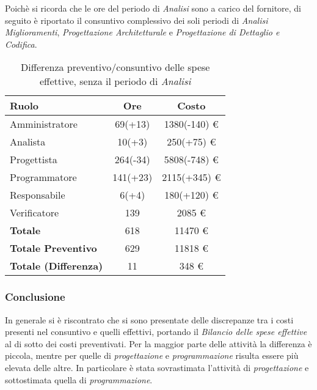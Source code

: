 Poich\`e si ricorda che le ore del periodo di \textit{Analisi} sono a carico del fornitore, di seguito \`e riportato il consuntivo complessivo dei soli periodi di \textit{Analisi Miglioramenti}, \textit{Progettazione Architetturale} e \textit{Progettazione di Dettaglio e Codifica}.

\begin{table}[H]
	\centering
	\begin{tabular}{ l c c }
		\textbf{Ruolo} & \textbf{Ore} & \textbf{Costo} \\
		\hline
		Amministratore & 69(+13) & 1380(-140) \euro{} \\
		Analista & 10(+3) & 250(+75) \euro{} \\
		Progettista & 264(-34) & 5808(-748) \euro{} \\
		Programmatore & 141(+23) & 2115(+345) \euro{} \\
		Responsabile & 6(+4) & 180(+120) \euro{} \\
		Verificatore & 139 & 2085 \euro{} \\
		\hline
		\textbf{Totale \glossaryItem{Consuntivo}} & 618 & 11470 \euro{} \\
		\hline
		\textbf{Totale Preventivo} & 629 & 11818 \euro{} \\
		\hline
		\textbf{Totale (Differenza)} & 11 & 348 \euro{} \\
		\hline
	\end{tabular}
	\caption{Differenza preventivo/consuntivo delle spese effettive, senza il periodo di \textit{Analisi}}
\end{table}




\subsubsection{Conclusione}
In generale si \`e riscontrato che si sono presentate delle discrepanze tra i costi presenti nel consuntivo e quelli effettivi, portando il \textit{Bilancio delle spese effettive} al di sotto dei costi preventivati. 
Per la maggior parte delle attivit\`a la differenza \`e piccola, mentre per quelle di \textit{progettazione} e \textit{programmazione} risulta essere pi\`u elevata delle altre.
In particolare \`e stata sovrastimata l'attivit\`a di \textit{progettazione} e sottostimata quella di \textit{programmazione}.






\newpage
